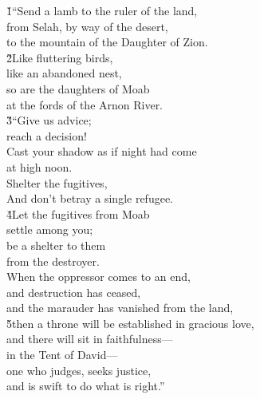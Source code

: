 \begin{poetry}
\poeml {}
\v{1}``Send a lamb to the ruler of the land, \\
\poemll    from Selah, by way of the desert, \\
\poemlll       to the mountain of the Daughter of Zion. \\
\poeml \v{2}Like fluttering birds, \\
\poemll    like an abandoned nest, \\
\poeml so are the daughters of Moab \\
\poemll    at the fords of the Arnon River. \\
\poeml \v{3}``Give us advice; \\
\poemll    reach a decision! \\
\poeml Cast your shadow as if night had come \\
\poemll    at high noon. \\
\poeml Shelter the fugitives, \\
\poemll    And don't betray a single refugee. \\
\poeml \v{4}Let the fugitives from Moab \\
\poemll    settle among you; \\
\poeml be a shelter to them \\
\poemll    from the destroyer. \\
\poeml When the oppressor comes to an end, \\
\poemll    and destruction has ceased, \\
\poemlll       and the marauder has vanished from the land, \\
\poeml \v{5}then a throne will be established in gracious love, \\
\poemll    and there will sit in faithfulness--- \\
\poemlll       in the Tent of David--- \\
\poeml one who judges, seeks justice, \\
\poemll    and is swift to do what is right.'' \\

\end{poetry}

